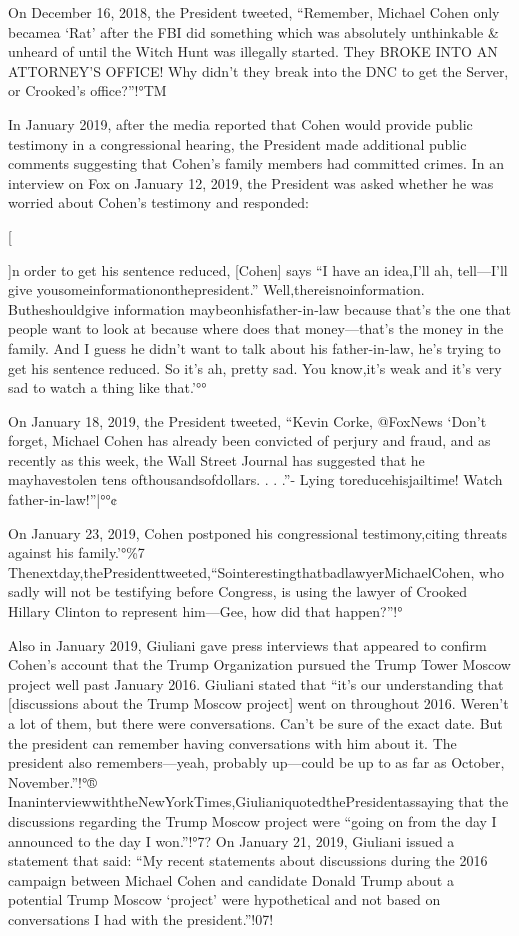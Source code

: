 On December 16, 2018, the President tweeted, “Remember, Michael Cohen only becamea ‘Rat' after the FBI did something which was absolutely unthinkable \& unheard of until the Witch Hunt was illegally started. They BROKE INTO AN ATTORNEY'S OFFICE! Why didn't they break into the DNC to get the Server, or Crooked's office?”!°TM

In January 2019, after the media reported that Cohen would provide public testimony in a congressional hearing, the President made additional public comments suggesting that Cohen's family members had committed crimes. In an interview on Fox on January 12, 2019, the President was asked whether he was worried about Cohen's testimony and responded:

[{]n order to get his sentence reduced, [Cohen] says “I have an idea,I'll ah, tell—I'll give yousomeinformationonthepresident.” Well,thereisnoinformation. Butheshouldgive information maybeonhisfather-in-law because that's the one that people want to look at because where does that money—that's the money in the family. And I guess he didn't want to talk about his father-in-law, he's trying to get his sentence reduced. So it's ah, pretty sad. You know,it's weak and it's very sad to watch a thing like that.'°°

On January 18, 2019, the President tweeted, “Kevin Corke, @FoxNews ‘Don't forget, Michael Cohen has already been convicted of perjury and fraud, and as recently as this week, the Wall Street Journal has suggested that he mayhavestolen tens ofthousandsofdollars. . . .”- Lying toreducehisjailtime! Watch father-in-law!”|°°¢

On January 23, 2019, Cohen postponed his congressional testimony,citing threats against his family.'°\%7 Thenextday,thePresidenttweeted,“SointerestingthatbadlawyerMichaelCohen, who sadly will not be testifying before Congress, is using the lawyer of Crooked Hillary Clinton to represent him—Gee, how did that happen?”!°%

Also in January 2019, Giuliani gave press interviews that appeared to confirm Cohen's account that the Trump Organization pursued the Trump Tower Moscow project well past January 2016. Giuliani stated that “it's our understanding that [discussions about the Trump Moscow project] went on throughout 2016. Weren't a lot of them, but there were conversations. Can't be sure of the exact date. But the president can remember having conversations with him about it.
The president also remembers—yeah, probably up—could be up to as far as October, November.”!°® InaninterviewwiththeNewYorkTimes,GiulianiquotedthePresidentassaying that the discussions regarding the Trump Moscow project were “going on from the day I announced to the day I won.”!°7? On January 21, 2019, Giuliani issued a statement that said: “My recent statements about discussions during the 2016 campaign between Michael Cohen and candidate Donald Trump about a potential Trump Moscow ‘project' were hypothetical and not based on conversations I had with the president.”!07!

}
